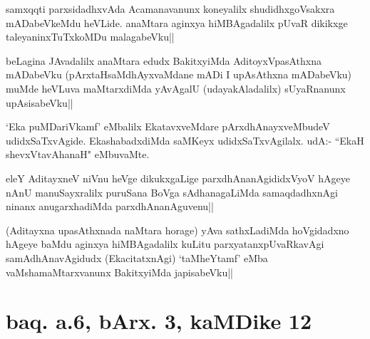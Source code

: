 
\begin{artha}
samxqqti parxsidadhxvAda Acamanavanunx koneyalilx shudidhxgoVsakxra 
mADabeVkeMdu heVLide. anaMtara aginxya hiMBAgadalilx pUvaR dikikxge 
taleyaninxTuTxkoMDu malagabeVku||
\end{artha}


\begin{artha}
beLagina JAvadalilx anaMtara edudx BakitxyiMda AditoyxVpasAthxna 
mADabeVku (pArxtaHsaMdhAyxvaMdane mADi I upAsAthxna mADabeVku) muMde 
heVLuva maMtarxdiMda yAvAgalU (udayakAladalilx) sUyaRnanunx 
upAsisabeVku||
\end{artha}


\begin{artha}
`Eka puMDariVkamf' eMbalilx EkatavxveMdare pArxdhAnayxveMbudeV 
udidxSaTxvAgide. EkashabadxdiMda saMKeyx udidxSaTxvAgilalx. udA:- 
``EkaH shevxVtavAhanaH" eMbuvaMte.
\end{artha}


\begin{artha}
eleY AditayxneV niVnu heVge dikukxgaLige parxdhAnanAgididxVyoV hAgeye 
nAnU manuSayxralilx puruSana BoVga sAdhanagaLiMda samaqdadhxnAgi 
ninanx anugarxhadiMda parxdhAnanAguvenu||
\end{artha}

\begin{artha}
(Aditayxna upasAthxnada naMtara horage) yAva sathxLadiMda hoVgidadxno 
hAgeye baMdu aginxya hiMBAgadalilx kuLitu parxyatanxpUvaRkavAgi 
samAdhAnavAgidudx (EkacitatxnAgi) `taMheYtamf' eMba 
vaMshamaMtarxvanunx BakitxyiMda japisabeVku||
\end{artha}

\section*{baq. a.6, bArx. 3, kaMDike 12}

\stext

\stext

\stext

\stext

\stext

\stext


